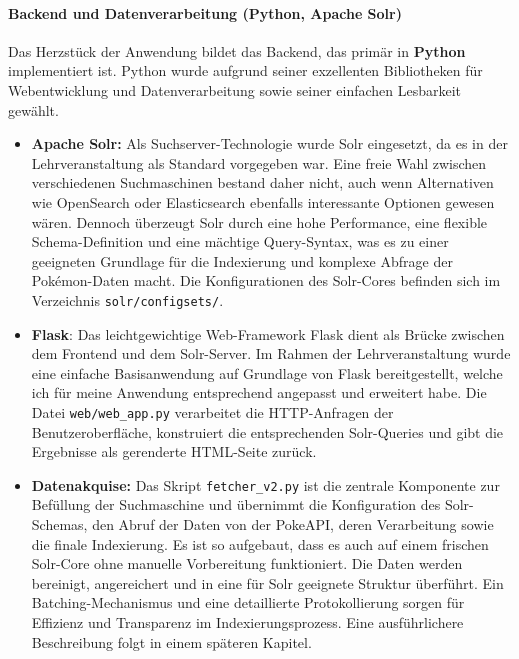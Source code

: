 \paragraph{Backend und Datenverarbeitung (Python, Apache Solr)}
Das Herzstück der Anwendung bildet das Backend, das primär in \textbf{Python} implementiert ist. Python wurde aufgrund seiner exzellenten Bibliotheken für Webentwicklung und Datenverarbeitung sowie seiner einfachen Lesbarkeit gewählt.
\begin{itemize}
    \item \textbf{Apache Solr:} Als Suchserver-Technologie wurde Solr eingesetzt, da es in der Lehrveranstaltung als Standard vorgegeben war. Eine freie Wahl zwischen verschiedenen Suchmaschinen bestand daher nicht, auch wenn Alternativen wie OpenSearch oder Elasticsearch ebenfalls interessante Optionen gewesen wären. Dennoch überzeugt Solr durch eine hohe Performance, eine flexible Schema-Definition und eine mächtige Query-Syntax, was es zu einer geeigneten Grundlage für die Indexierung und komplexe Abfrage der Pokémon-Daten macht. Die Konfigurationen des Solr-Cores befinden sich im Verzeichnis \texttt{solr/configsets/}.
    
    \item \textbf{Flask}: Das leichtgewichtige Web-Framework Flask dient als Brücke zwischen dem Frontend und dem Solr-Server. Im Rahmen der Lehrveranstaltung wurde eine einfache Basisanwendung auf Grundlage von Flask bereitgestellt, welche ich für meine Anwendung entsprechend angepasst und erweitert habe. Die Datei \texttt{web/web\_app.py} verarbeitet die HTTP-Anfragen der Benutzeroberfläche, konstruiert die entsprechenden Solr-Queries und gibt die Ergebnisse als gerenderte HTML-Seite zurück.
    
    \item \textbf{Datenakquise:} 
    Das Skript \texttt{fetcher\_v2.py} ist die zentrale Komponente zur Befüllung der Suchmaschine und übernimmt die Konfiguration des Solr-Schemas, den Abruf der Daten von der PokeAPI, deren Verarbeitung sowie die finale Indexierung. Es ist so aufgebaut, dass es auch auf einem frischen Solr-Core ohne manuelle Vorbereitung funktioniert. Die Daten werden bereinigt, angereichert und in eine für Solr geeignete Struktur überführt. Ein Batching-Mechanismus und eine detaillierte Protokollierung sorgen für Effizienz und Transparenz im Indexierungsprozess. Eine ausführlichere Beschreibung folgt in einem späteren Kapitel.
\end{itemize}

